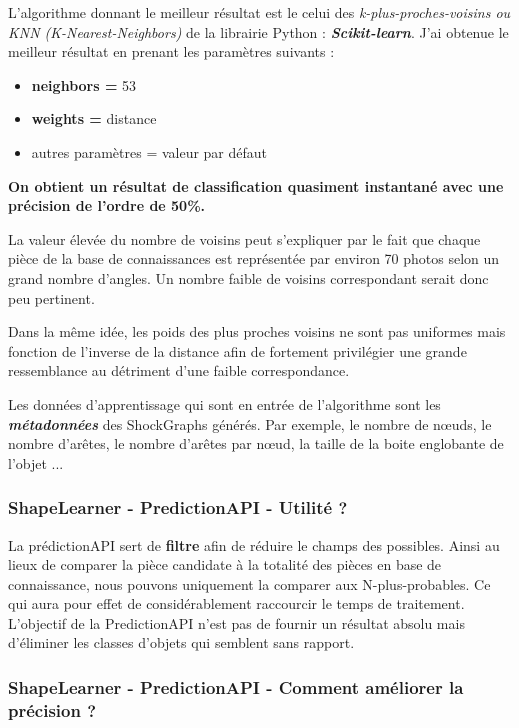L'algorithme donnant le meilleur résultat est le celui des \textit{k-plus-proches-voisins ou KNN (K-Nearest-Neighbors)} de la librairie Python : \textbf{\textit{Scikit-learn}}. J'ai obtenue le meilleur résultat en prenant les paramètres suivants :

\begin{itemize}
	\item \textbf{neighbors =}  53
	\item \textbf{weights =}  distance
	\item autres paramètres = valeur par défaut
\end{itemize}

\begin{center}
\textbf{On obtient un résultat de classification quasiment instantané avec une précision de l'ordre de 50\%.}
\end{center}

La valeur élevée du nombre de voisins peut s'expliquer par le fait que chaque pièce de la base de connaissances est représentée par environ 70 photos selon un grand nombre d'angles. Un nombre faible de voisins correspondant serait donc peu pertinent.

Dans la même idée, les poids des plus proches voisins ne sont pas uniformes mais fonction de l'inverse de la distance afin de fortement privilégier une grande ressemblance au détriment d'une faible correspondance.

Les données d'apprentissage qui sont en entrée de l'algorithme sont les \textit{\textbf{métadonnées}} des ShockGraphs générés. Par exemple, le nombre de nœuds, le nombre d'arêtes, le nombre d'arêtes par nœud, la taille de la boite englobante de l'objet ...

\subsubsection{ShapeLearner - PredictionAPI - Utilité ?}

La prédictionAPI sert de \textbf{filtre} afin de réduire le champs des possibles. Ainsi au lieux de comparer la pièce candidate à la totalité des pièces en base de connaissance, nous pouvons uniquement la comparer aux N-plus-probables. Ce qui aura pour effet de considérablement raccourcir le temps de traitement. L'objectif de la PredictionAPI n'est pas de fournir un résultat absolu mais d'éliminer les classes d'objets qui semblent sans rapport.

\subsubsection{ShapeLearner - PredictionAPI - Comment améliorer la précision ?}

